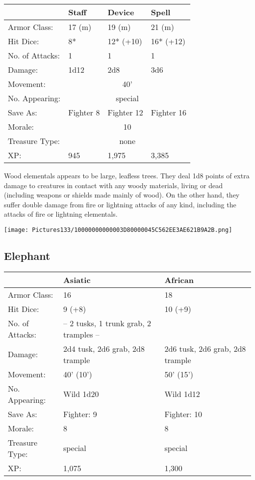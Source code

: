\documentclass[a4paper,twoside,openany,10pt]{book}
\begin{document}
\begin{multicols}{2}
\begin{tabularx}{0.48\textwidth}{@{}lllX@{}}
& Staff & Device & Spell \\\hline
Armor Class: & 17 (m) & 19 (m) & 21 (m) \\\hline
Hit Dice: & 8* & 12* (+10) & 16* (+12) \\\hline
No. of Attacks: & 1 & 1 & 1 \\\hline
Damage: & 1d12 & 2d8 & 3d6 \\\hline
Movement:  & \multicolumn{3}{c}{40'}\\\hline
No. Appearing: &\multicolumn{3}{c}{special} \\\hline
Save As: & Fighter 8 & Fighter 12 & Fighter 16 \\\hline
Morale: & \multicolumn{3}{c}{10} \\\hline
Treasure Type: & \multicolumn{3}{c}{none} \\\hline
XP: & 945 & 1,975 & 3,385 \\\hline
\end{tabularx}\medskip

Wood elementals appears to be large, leafless trees. They deal 1d8 points of extra damage to creatures in contact with any woody materials, living or dead (including weapons or shields made mainly of wood). On the other hand, they suffer double damage from fire or lightning attacks of any kind, including the attacks of fire or lightning elementals.\\

\begin{center}
	\texttt{[image: Pictures133/10000000000003D80000045C562EE3AE621B9A2B.png]}

\end{center}


\subsection*{Elephant}\label{elephant}

\begin{tabularx}{0.48\textwidth}{@{}lXX@{}}
& Asiatic & African \\\hline
Armor Class: & 16 & 18 \\\hline
Hit Dice: & 9 (+8) & 10 (+9) \\\hline
No. of Attacks: & -- 2 tusks, 1 trunk grab, 2 tramples -- & \\\hline
Damage: & 2d4 tusk, 2d6 grab, 2d8 trample & 2d6 tusk, 2d6 grab, 2d8 trample \\\hline
Movement: & 40' (10') & 50' (15') \\\hline
No. Appearing: & Wild 1d20 & Wild 1d12 \\\hline
Save As: & Fighter: 9 & Fighter: 10 \\\hline
Morale: & 8 & 8 \\\hline
Treasure Type: & special & special \\\hline
XP: & 1,075 & 1,300 \\\hline
\end{tabularx}\medskip


\end{multicols}
\end{document}
